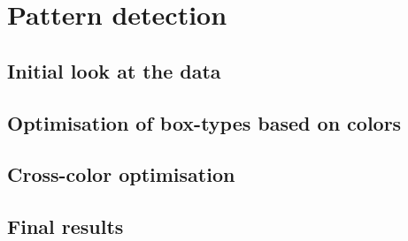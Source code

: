 \documentclass{beamer}
\begin{document}
\section{Pattern detection}


\subsection{Initial look at the data}


\subsection{Optimisation of box-types based on colors}



\subsection{Cross-color optimisation}


\subsection{Final results}

\end{document}
